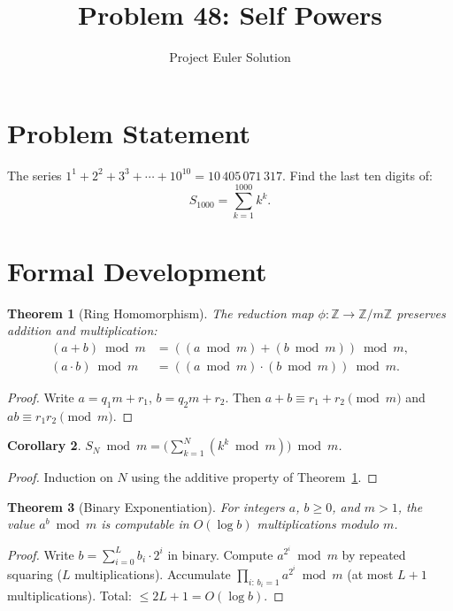 \documentclass[12pt]{article}
\title{Problem 48: Self Powers}
\author{Project Euler Solution}
\date{}
\newtheorem{theorem}{Theorem}
\newtheorem{corollary}[theorem]{Corollary}
\begin{document}
\maketitle

\section{Problem Statement}

The series $1^1 + 2^2 + 3^3 + \cdots + 10^{10} = 10\,405\,071\,317$. Find the last ten digits of:
\[
S_{1000} = \sum_{k=1}^{1000} k^k.
\]

\section{Formal Development}

\begin{theorem}[Ring Homomorphism]\label{thm:mod}
The reduction map $\phi\colon \mathbb{Z} \to \mathbb{Z}/m\mathbb{Z}$ preserves addition and multiplication:
\begin{align*}
(a + b) \bmod m &= ((a \bmod m) + (b \bmod m)) \bmod m, \\
(a \cdot b) \bmod m &= ((a \bmod m) \cdot (b \bmod m)) \bmod m.
\end{align*}
\end{theorem}

\begin{proof}
Write $a = q_1 m + r_1$, $b = q_2 m + r_2$. Then $a + b \equiv r_1 + r_2 \pmod{m}$ and $ab \equiv r_1 r_2 \pmod{m}$.
\end{proof}

\begin{corollary}\label{cor:sum}
$S_N \bmod m = \bigl(\sum_{k=1}^{N} (k^k \bmod m)\bigr) \bmod m$.
\end{corollary}

\begin{proof}
Induction on $N$ using the additive property of Theorem~\ref{thm:mod}.
\end{proof}

\begin{theorem}[Binary Exponentiation]\label{thm:binexp}
For integers $a$, $b \geq 0$, and $m > 1$, the value $a^b \bmod m$ is computable in $O(\log b)$ multiplications modulo $m$.
\end{theorem}

\begin{proof}
Write $b = \sum_{i=0}^{L} b_i \cdot 2^i$ in binary. Compute $a^{2^i} \bmod m$ by repeated squaring ($L$ multiplications). Accumulate $\prod_{i:\, b_i=1} a^{2^i} \bmod m$ (at most $L+1$ multiplications). Total: $\leq 2L + 1 = O(\log b)$.
\end{proof}
\end{document}

